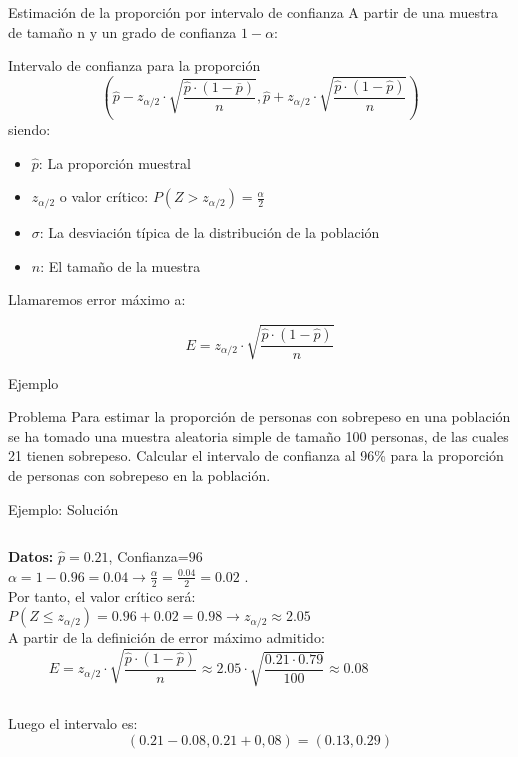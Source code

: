 \documentclass[11pt,handout]{beamer}
\begin{document}
\begin{frame}
{Estimación de la proporción por intervalo de confianza}
A partir de una muestra de tamaño n y un grado de confianza $1-\alpha$: 
\begin{block}{Intervalo de confianza para la proporción}
$$ \left( \widehat{p} - z_{\alpha / 2}\cdot \sqrt{\frac{\widehat{p}\cdot\left(1-\overline{p} \right)}{n}} ,  \widehat{p} + z_{\alpha / 2}\cdot \sqrt{\frac{\widehat{p}\cdot\left(1-\widehat{p} \right)}{n}}\right)$$
siendo: \begin{itemize}
\item $\widehat{p}$: La proporción muestral
\item $z_{\alpha / 2}$ o valor crítico:  $P(Z>z_{\alpha / 2})=\frac{\alpha}{2}$ 
\item $\sigma$: La desviación típica de la distribución de la población \item $n$: El tamaño de la muestra
\end{itemize}
\end{block}
Llamaremos error máximo a:
\begin{block}{}
$$E=z_{\alpha / 2}\cdot \sqrt{\frac{\widehat{p}\cdot\left(1-\widehat{p} \right)}{n}}$$
\end{block}

\end{frame}

\begin{frame}
{Ejemplo}
\begin{block}{Problema} Para estimar la proporción de personas con sobrepeso en una población se ha tomado una
muestra aleatoria simple de tamaño 100 personas, de las cuales 21 tienen sobrepeso. Calcular el intervalo
de confianza al 96\% para la proporción de personas con sobrepeso en la población.
\end{block}
\end{frame}

\begin{frame}{Ejemplo: Solución}
\begin{columns}
\begin{column}{0.55\textwidth}
    \textbf{Datos:} $\widehat{p}=0.21$, Confianza=$96$ \\
$\alpha=1-0.96=0.04 \to \frac{\alpha}{2}=\frac{0.04}{2}=0.02$
. \\ Por tanto, el valor crítico será: \\

$P\left(Z \leqslant z_{\alpha / 2} \right)= 0.96 + 0.02 = 0.98 \to z_{\alpha / 2} \approx 2.05$ \\ 
A partir de la definición de error máximo admitido:
$$E=z_{\alpha / 2}\cdot \sqrt{\frac{\widehat{p}\cdot\left(1-\widehat{p} \right)}{n}}\approx 2.05 \cdot \sqrt{\frac{0.21\cdot 0.79}{100}}\approx 0.08$$

\end{column}
\begin{column}{0.45\textwidth}
    
\end{column}
\end{columns}
Luego el intervalo es: $$\left( 0.21 - 0.08 , 0.21 + 0,08 \right) = \left(0.13, 0.29 \right)$$ 
\end{frame}
\end{document}

